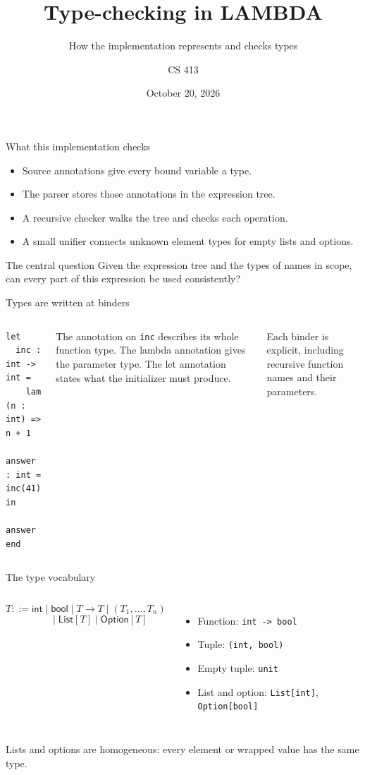 \documentclass[aspectratio=169,11pt]{beamer}
\title[Typed LAMBDA]{Type-checking in LAMBDA}
\subtitle{How the implementation represents and checks types}
\author{CS 413}
\date{October 20, 2026}
\newcommand{\Int}{\mathsf{int}}
\newcommand{\Bool}{\mathsf{bool}}
\newcommand{\ListT}[1]{\mathsf{List}[#1]}
\newcommand{\OptionT}[1]{\mathsf{Option}[#1]}
\begin{document}
\begin{frame}
  \titlepage
\end{frame}

\begin{frame}{What this implementation checks}
\begin{itemize}
  \item Source annotations give every bound variable a type.
  \item The parser stores those annotations in the expression tree.
  \item A recursive checker walks the tree and checks each operation.
  \item A small unifier connects unknown element types for empty lists and options.
\end{itemize}
\begin{block}{The central question}
Given the expression tree and the types of names in scope, can every part of this expression be used consistently?
\end{block}
\end{frame}

\begin{frame}[fragile]{Types are written at binders}
\begin{columns}[T]
\begin{lstlisting}
let
  inc : int -> int =
    lam (n : int) => n + 1
  answer : int = inc(41)
in
  answer
end
\end{lstlisting}
The annotation on \texttt{inc} describes its whole function type. The lambda annotation gives the parameter type. The let annotation states what the initializer must produce.
\medskip

Each binder is explicit, including recursive function names and their parameters.
\end{columns}
\end{frame}

\begin{frame}{The type vocabulary}
\begin{columns}[T]
\[
T ::= \Int \mid \Bool \mid T\to T \mid (T_1,\ldots,T_n)
\]
\[
\phantom{T ::=}\mid \ListT{T} \mid \OptionT{T}
\]
\begin{itemize}
  \item Function: \texttt{int -> bool}
  \item Tuple: \texttt{(int, bool)}
  \item Empty tuple: \texttt{unit}
  \item List and option: \texttt{List[int]}, \texttt{Option[bool]}
\end{itemize}
\end{columns}
\bigskip
Lists and options are homogeneous: every element or wrapped value has the same type.
\end{frame}
\end{document}
